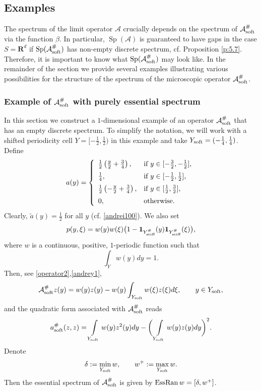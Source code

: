 \documentclass[11pt]{article}
\renewcommand{\b}{\beta}
\newcommand\stiff{{\rm stiff}}
\newcommand\soft{{\rm soft}}
\newcommand{\R}{\mathbf{R}}
\def\AA{\mathcal{A}}
\DeclareMathOperator{\Sp}{Sp}
\def\b{\beta}
\theoremstyle{remark}
\begin{document}
\subsection{Examples}

The spectrum of the limit operator $\AA$ crucially depends on the spectrum of $\AA_\soft^\#$ via the function $\b$. In particular, $\Sp(\AA)$ is guaranteed to have gaps in the case $S=\R^d$ if $\Sp(\AA_\soft^\#)$ has non-empty discrete spectrum, cf. Proposition \ref{p:5.7}. Therefore, it is important to know what $\Sp(\AA_\soft^\#)$ may look like. In the remainder of the section we provide several examples illustrating various possibilities for the structure  of the spectrum of the microscopic operator   $\AA_\soft^\# $.

\subsubsection{Example of $\AA_\soft^\# $ with purely essential spectrum}
In this  section we construct a $1$-dimensional example of an operator $\AA_\soft^\# $ that has  an empty discrete spectrum.
To simplify the notation, we will work with a shifted periodicity cell $Y=[-\frac{1}{2},\frac{1}{2})$ in this example and take $Y_\soft =(-\frac{1}{4},\frac{1}{4})$.
Define
$$
a(y)=\left\{
\begin{array}{ll}
\frac12\left(\frac y 2+\frac34\right), &\hbox{if }y\in[-\frac32,-\frac12],\\[2mm]
	\frac14,&\hbox{if }y\in[-\frac12,\frac12],\\[2mm]
	\frac12\left(-\frac y 2+\frac34\right), &\hbox{if }y\in[\frac12,\frac32],\\[2mm]
	0,&\hbox{otherwise}.
\end{array}
\right.
$$
Clearly, $\tilde a(y)=\frac12$ for all $y$ (cf. \eqref{andrei100}).
We also set \begin{equation}\label{60}
p(y,\xi)=w(y)w(\xi)\big(1-\mathbf{1}_{Y_\stiff^{\#}}(y)\mathbf{1}_{Y_\stiff^{\#}}(\xi)\big),
\end{equation} where $w$ is a continuous,   positive, $1$-periodic   function   such that
\begin{equation}\label{73a}
	\int_{Y} w(y)dy=1.
\end{equation}
Then, see \eqref{operator2},\eqref{andrey1},
$$
\AA_\soft^\# z(y)=w(y)z(y)-w(y)\int_{Y_\soft } w(\xi) z(\xi)d\xi,\qquad y\in {Y_\soft },
$$
 and the quadratic form associated with  $\AA_\soft^\# $ reads
$$
a_\soft^\#( z,z )= \int\limits_{Y_\soft } w(y) z^2(y)dy-\bigg(\int\limits_{Y_\soft } w(y)z(y)dy\bigg)^2.
$$
Denote
\begin{equation*}
	\delta: = \min_{Y_\soft} w, \qquad w^+: = \max_{Y_\soft} w.
\end{equation*}
Then the essential spectrum of $\AA_\soft^\# $ is given by ${\rm EssRan} \, w = [\delta,w^+]$.
\end{document}

